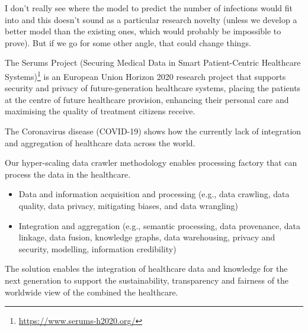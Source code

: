 {{    I don't really see where the model to predict the number of infections would fit into and this doesn't sound as a particular research novelty (unless we develop a better model than the existing ones, which would probably be impossible to prove). But if we go for some other angle, that could change things.
}}

The Serums Project (Securing Medical Data in Smart Patient-Centric Healthcare Systems)\footnote{\url{https://www.serums-h2020.org/}} is an European Union Horizon 2020 research project that supports security and privacy of future-generation healthcare systems, placing the patients at the centre of future healthcare provision, enhancing their personal care and maximising the quality of treatment citizens receive. 

The Coronavirus disease (COVID-19) shows how the currently lack of integration and aggregation of healthcare data across the world.

Our hyper-scaling data crawler methodology enables processing factory that can process the data in the healthcare.

\begin{itemize}
    \item Data and information acquisition and processing (e.g., data crawling, data quality, data privacy, mitigating biases, and data wrangling)
    \item Integration and aggregation (e.g., semantic processing, data provenance, data linkage, data fusion, knowledge graphs, data warehousing, privacy and security, modelling, information credibility)
\end{itemize}

The solution enables the integration of healthcare data and knowledge for the next generation to support the sustainability, transparency and fairness of the worldwide view of the combined the healthcare.
